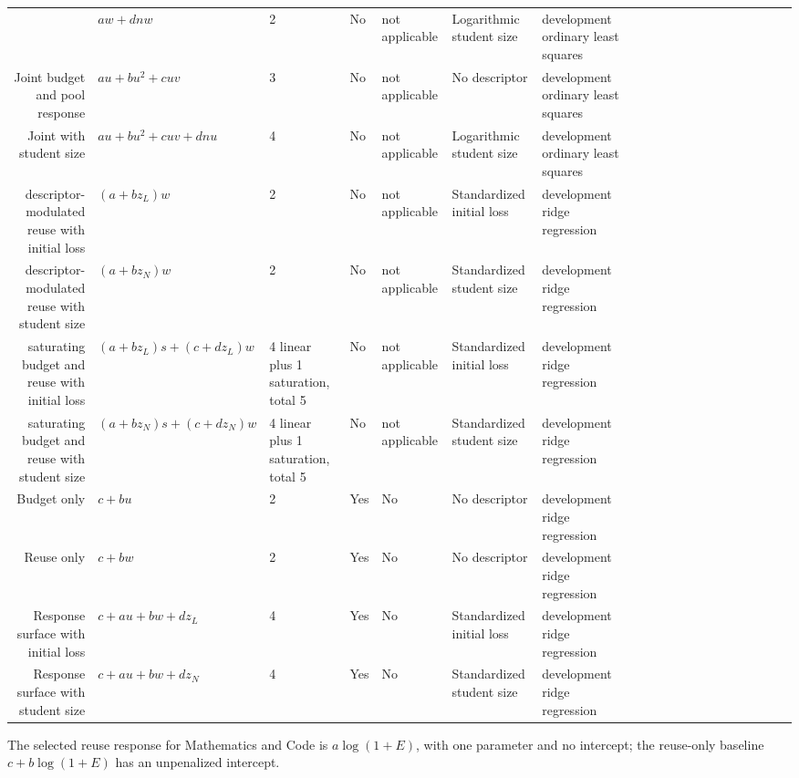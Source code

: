 \begin{table}[tb]
\begin{tabular*}{\textwidth}
{Reuse with student size} & $a w+d n w$ & 2 & No & not applicable & Logarithmic student size & {development ordinary least squares} \\
{Joint budget and pool response} & $a u+b u^2+c u v$ & 3 & No & not applicable & No descriptor & {development ordinary least squares} \\
{Joint with student size} & $a u+b u^2+c u v+d n u$ & 4 & No & not applicable & Logarithmic student size & {development ordinary least squares} \\
descriptor-modulated reuse with initial loss & $(a+b z_L)w$ & 2 & No & not applicable & Standardized initial loss & {development ridge regression} \\
descriptor-modulated reuse with student size & $(a+b z_N)w$ & 2 & No & not applicable & Standardized student size & {development ridge regression} \\
saturating budget and reuse with initial loss & $(a+b z_L)s+(c+d z_L)w$ & 4 linear plus 1 saturation, total 5 & No & not applicable & Standardized initial loss & {development ridge regression} \\
saturating budget and reuse with student size & $(a+b z_N)s+(c+d z_N)w$ & 4 linear plus 1 saturation, total 5 & No & not applicable & Standardized student size & {development ridge regression} \\
Budget only & $c+b u$ & 2 & Yes & No & No descriptor & {development ridge regression} \\
Reuse only & $c+b w$ & 2 & Yes & No & No descriptor & {development ridge regression} \\
{Response surface with initial loss} & $c+a u+b w+d z_L$ & 4 & Yes & No & Standardized initial loss & {development ridge regression} \\
{Response surface with student size} & $c+a u+b w+d z_N$ & 4 & Yes & No & Standardized student size & {development ridge regression} \\
\bottomrule
\end{tabular*}
\par\smallskip\begin{minipage}{\linewidth}\footnotesize The selected reuse response for Mathematics and Code is $a\log(1+E)$, with one parameter and no intercept; the reuse-only baseline $c+b\log(1+E)$ has an unpenalized intercept.\end{minipage}
\end{table}
\begingroup\normalfont\scriptsize
\par\smallskip
